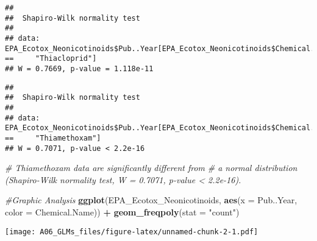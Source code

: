 \documentclass[]{article}
\newenvironment{Shaded}{\begin{snugshade}}{\end{snugshade}}
\newcommand{\KeywordTok}[1]{\textcolor[rgb]{0.13,0.29,0.53}{\textbf{#1}}}
\newcommand{\DataTypeTok}[1]{\textcolor[rgb]{0.13,0.29,0.53}{#1}}
\newcommand{\StringTok}[1]{\textcolor[rgb]{0.31,0.60,0.02}{#1}}
\newcommand{\CommentTok}[1]{\textcolor[rgb]{0.56,0.35,0.01}{\textit{#1}}}
\newcommand{\OperatorTok}[1]{\textcolor[rgb]{0.81,0.36,0.00}{\textbf{#1}}}
\newcommand{\NormalTok}[1]{#1}
\begin{document}
\begin{verbatim}
## 
##  Shapiro-Wilk normality test
## 
## data:  EPA_Ecotox_Neonicotinoids$Pub..Year[EPA_Ecotox_Neonicotinoids$Chemical.Name ==     "Thiacloprid"]
## W = 0.7669, p-value = 1.118e-11
\end{verbatim}

\begin{Shaded}
\end{Shaded}

\begin{verbatim}
## 
##  Shapiro-Wilk normality test
## 
## data:  EPA_Ecotox_Neonicotinoids$Pub..Year[EPA_Ecotox_Neonicotinoids$Chemical.Name ==     "Thiamethoxam"]
## W = 0.7071, p-value < 2.2e-16
\end{verbatim}

\begin{Shaded}
\begin{Highlighting}[]
\CommentTok{# Thiamethoxam data are significantly different from }
\CommentTok{# a normal distribution (Shapiro-Wilk normality test, W = 0.7071, p-value < 2.2e-16).}

\CommentTok{#Graphic Analysis}
\KeywordTok{ggplot}\NormalTok{(EPA_Ecotox_Neonicotinoids, }\KeywordTok{aes}\NormalTok{(}\DataTypeTok{x =}\NormalTok{ Pub..Year, }\DataTypeTok{color =}\NormalTok{ Chemical.Name)) }\OperatorTok{+}
\StringTok{  }\KeywordTok{geom_freqpoly}\NormalTok{(}\DataTypeTok{stat =} \StringTok{"count"}\NormalTok{)}
\end{Highlighting}
\end{Shaded}

\texttt{[image: A06\_GLMs\_files/figure-latex/unnamed-chunk-2-1.pdf]}

\begin{Shaded}
\end{Shaded}
\end{document}
